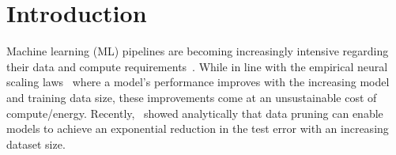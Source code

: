 \vspace{-0.5cm}
\section{Introduction}
\label{sec:introduction}
Machine learning (ML) pipelines are becoming increasingly intensive regarding their data and compute requirements~\cite{touvron2023llama, achiam2023gpt}. 
While in line with the empirical neural scaling laws~\cite{kaplan2020scaling, hestness2017deep, henighan2020scaling, rosenfeld2019constructive} where a model's performance improves with the increasing model and training data size, these improvements come at an unsustainable cost of compute/energy. 
Recently,~\cite{sorscher2022beyond} showed analytically that data pruning can enable models to achieve an exponential reduction in the test error with an increasing dataset size.

